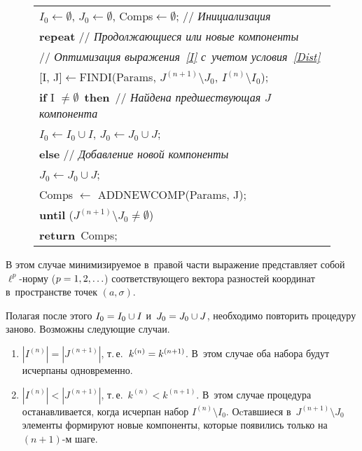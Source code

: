 \begin{multicols}{2}
\begin{figure*}[b]
{\begin{center}
\begin{tabular}{l}
\hspace*{8mm}$I_0\gets \emptyset$, $J_0\gets \emptyset$, Comps$\gets \emptyset$; // 
\textit{Инициализация}\\
\hspace{8mm}\textbf{repeat} // \textit{Продолжающиеся или новые компоненты}
\\
 \hspace*{15mm}// \textit{Оптимизация выражения~\eqref{I} с~учетом условия~\eqref{Dist}}
 \\
\hspace*{15mm}[I, J]$\gets${\normalsize F}IND{\normalsize I}(Params, $J^{(n+1)}\setminus 
J_0$, $I^{(n)}\setminus I_0$);
\\
\hspace*{15mm}\textbf{if} I $\neq \emptyset$\ \textbf{then}\ // \textit{Найдена 
предшествующая $J$ компонента}
 \\   
\hspace*{20mm}$I_0\gets I_0\cup I$, $J_0\gets J_0\cup J$;
\\
\hspace*{15mm}\textbf{else} // \textit{Добавление новой компоненты}
\\
\hspace*{20mm}$J_0\gets J_0\cup J$;
\\
\hspace*{20mm}Comps $\gets$ {\normalsize A}DD{\normalsize N}EW{\normalsize C}OMP({Params, J});
\\
\hspace*{8mm}\textbf{until} ($J^{(n+1)}\setminus J_0 \neq \emptyset$)
\\
\hspace*{8mm}\textbf{return}\ Comps;\\
\hline
\end{tabular}
\end{center}}
\vspace*{-6pt}
\end{figure*}


В этом случае минимизируемое в~правой час\-ти выражение 
представляет собой $\ell^p$-нор\-му ($p\hm=1,2,\ldots$) соответствующего 
вектора разностей координат в~пространстве точек $(a,\sigma)$.

Полагая после этого $I_0\hm=I_0\cup I$ и~$J_0\hm=J_0\cup J$, необходимо 
повторить процедуру заново. Возможны следующие случаи.
\begin{enumerate}
\item $\left|I^{(n)}\right|=\left|J^{(n+1)}\right|$, т.\,е.\ 
$k^{(n)}\hm=k^{(n+1)}$. В~этом случае оба набора будут исчерпаны одновременно.
\item $\left|I^{(n)}\right|<\left|J^{(n+1)}\right|$, т.\,е.\
 $k^{(n)}<k^{(n+1)}$. В~этом случае процедура останавливается, 
 когда исчерпан набор $I^{(n)} \setminus I_0$. Оcтавшиеся 
 в~$J^{(n+1)}\setminus J_0$ элементы формируют новые компоненты, 
 которые появились только на $(n+1)$-м шаге.
\end{enumerate}


\end{multicols}

